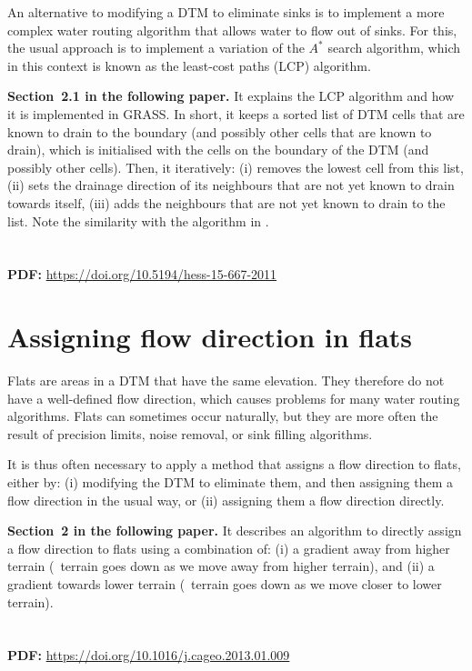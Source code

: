 An alternative to modifying a DTM to eliminate sinks is to implement a more complex water routing algorithm that allows water to flow out of sinks.
For this, the usual approach is to implement a variation of the \(A^{*}\) search algorithm, which in this context is known as the least-cost paths (LCP) algorithm.

\begin{link-box}
\textbf{Section~2.1 in the following paper.} It explains the LCP algorithm and how it is implemented in GRASS\@.
In short, it keeps a sorted list of DTM cells that are known to drain to the boundary (and possibly other cells that are known to drain), which is initialised with the cells on the boundary of the DTM (and possibly other cells)\@.
Then, it iteratively: (i) removes the lowest cell from this list, (ii) sets the drainage direction of its neighbours that are not yet known to drain towards itself, (iii) adds the neighbours that are not yet known to drain to the list.
Note the similarity with the algorithm in \citet{Barnes14a}.
\\
\\
\\
\textbf{PDF:} \url{https://doi.org/10.5194/hess-15-667-2011}
\end{link-box}

\section{Assigning flow direction in flats}

Flats are areas in a DTM that have the same elevation.
They therefore do not have a well-defined flow direction, which causes problems for many water routing algorithms.
Flats can sometimes occur naturally, but they are more often the result of precision limits, noise removal, or sink filling algorithms.

It is thus often necessary to apply a method that assigns a flow direction to flats, either by: (i) modifying the DTM to eliminate them, and then assigning them a flow direction in the usual way, or (ii) assigning them a flow direction directly.

\begin{link-box}
\textbf{Section~2 in the following paper.} 
It describes an algorithm to directly assign a flow direction to flats using a combination of: (i) a gradient away from higher terrain (\ie\ terrain goes down as we move away from higher terrain), and (ii) a gradient towards lower terrain (\ie\ terrain goes down as we move closer to lower terrain).
\\
\\
\\
\textbf{PDF:} \url{https://doi.org/10.1016/j.cageo.2013.01.009}
\end{link-box}

